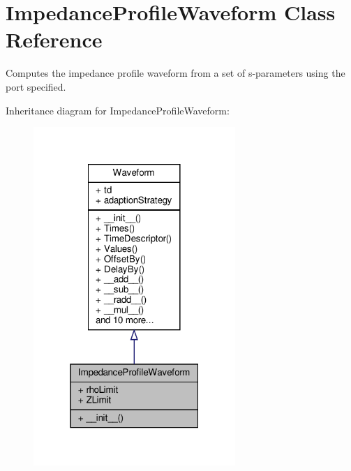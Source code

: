 \hypertarget{classSignalIntegrity_1_1ImpedanceProfile_1_1ImpedanceProfileWaveform_1_1ImpedanceProfileWaveform}{}\section{Impedance\+Profile\+Waveform Class Reference}
\label{classSignalIntegrity_1_1ImpedanceProfile_1_1ImpedanceProfileWaveform_1_1ImpedanceProfileWaveform}


Computes the impedance profile waveform from a set of s-\/parameters using the port specified.  




Inheritance diagram for Impedance\+Profile\+Waveform\+:
\nopagebreak
\begin{figure}[H]
\begin{center}
\leavevmode
\includegraphics[width=217pt]{classSignalIntegrity_1_1ImpedanceProfile_1_1ImpedanceProfileWaveform_1_1ImpedanceProfileWaveform__inherit__graph}
\end{center}
\end{figure}


